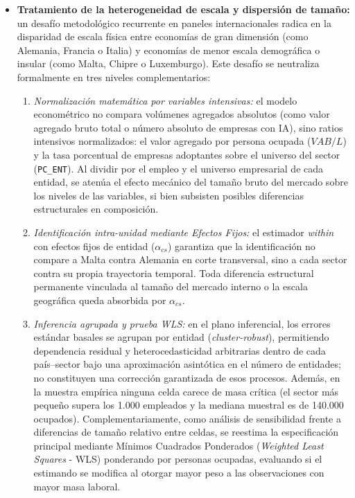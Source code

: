 \documentclass[12pt,a4paper]{article}
\begin{document}
\begin{itemize}
    \item \textbf{Tratamiento de la heterogeneidad de escala y dispersión de tamaño:} un desafío metodológico recurrente en paneles internacionales radica en la disparidad de escala física entre economías de gran dimensión (como Alemania, Francia o Italia) y economías de menor escala demográfica o insular (como Malta, Chipre o Luxemburgo). Este desafío se neutraliza formalmente en tres niveles complementarios:

    \begin{enumerate}

        \item \textit{Normalización matemática por variables intensivas:} el modelo econométrico no compara volúmenes agregados absolutos (como valor agregado bruto total o número absoluto de empresas con IA), sino ratios intensivos normalizados: el valor agregado por persona ocupada ($VAB/L$) y la tasa porcentual de empresas adoptantes sobre el universo del sector (\texttt{PC\_ENT}). Al dividir por el empleo y el universo empresarial de cada entidad, se atenúa el efecto mecánico del tamaño bruto del mercado sobre los niveles de las variables, si bien subsisten posibles diferencias estructurales en composición.

        \item \textit{Identificación intra-unidad mediante Efectos Fijos:} el estimador \textit{within} con efectos fijos de entidad ($\alpha_{cs}$) garantiza que la identificación no compare a Malta contra Alemania en corte transversal, sino a cada sector contra su propia trayectoria temporal. Toda diferencia estructural permanente vinculada al tamaño del mercado interno o la escala geográfica queda absorbida por $\alpha_{cs}$.

        \item \textit{Inferencia agrupada y prueba WLS:} en el plano inferencial, los errores estándar basales se agrupan por entidad (\textit{cluster-robust}), permitiendo dependencia residual y heterocedasticidad arbitrarias dentro de cada país--sector bajo una aproximación asintótica en el número de entidades; no constituyen una corrección garantizada de esos procesos. Además, en la muestra empírica ninguna celda carece de masa crítica (el sector más pequeño supera los 1.000 empleados y la mediana muestral es de 140.000 ocupados). Complementariamente, como análisis de sensibilidad frente a diferencias de tamaño relativo entre celdas, se reestima la especificación principal mediante Mínimos Cuadrados Ponderados (\textit{Weighted Least Squares} - WLS) ponderando por personas ocupadas, evaluando si el estimando se modifica al otorgar mayor peso a las observaciones con mayor masa laboral.

    \end{enumerate}

\end{itemize}
\end{document}
